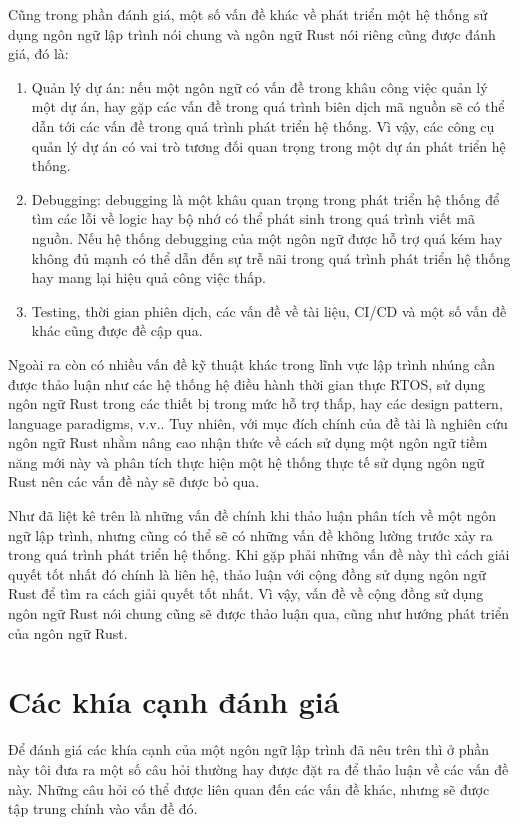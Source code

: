 Cũng trong phần đánh giá, một số vấn đề khác về phát triển một hệ thống sử dụng ngôn ngữ lập trình nói chung và ngôn ngữ Rust nói riêng cũng được đánh giá, đó là:

\begin{enumerate}
    \item Quản lý dự án: nếu một ngôn ngữ có vấn đề trong khâu công việc quản lý một dự án, hay gặp các vấn đề trong quá trình biên dịch mã nguồn sẽ có thể dẫn tới các vấn đề trong quá trình phát triển hệ thống. Vì vậy, các công cụ quản lý dự án có vai trò tương đối quan trọng trong một dự án phát triển hệ thống.

    \item Debugging: debugging là một khâu quan trọng trong phát triển hệ thống để tìm các lỗi về logic hay bộ nhớ có thể phát sinh trong quá trình viết mã nguồn.
Nếu hệ thống debugging của một ngôn ngữ được hỗ trợ quá kém hay không đủ mạnh có thể dẫn đến sự trễ nãi trong quá trình phát triển hệ thống hay mang lại hiệu quả công việc thấp.

    \item Testing, thời gian phiên dịch, các vấn đề về tài liệu, CI/CD và một số vấn đề khác cũng được đề cập qua.
\end{enumerate}

Ngoài ra còn có nhiều vấn đề kỹ thuật khác trong lĩnh vực lập trình nhúng cần được thảo luận như các hệ thống hệ điều hành thời gian thực RTOS, sử dụng ngôn ngữ Rust trong các thiết bị trong mức hỗ trợ thấp, hay các design pattern, language paradigms, v.v..
Tuy nhiên, với mục đích chính của đề tài là nghiên cứu ngôn ngữ Rust nhằm nâng cao nhận thức về cách sử dụng một ngôn ngữ tiềm năng mới này và phân tích thực hiện một hệ thống thực tế sử dụng ngôn ngữ Rust nên các vấn đề này sẽ được bỏ qua.

Như đã liệt kê trên là những vấn đề chính khi thảo luận phân tích về một ngôn ngữ lập trình, nhưng cũng có thể sẽ có những vấn đề không lường trước xảy ra trong quá trình phát triển hệ thống.
Khi gặp phải những vấn đề này thì cách giải quyết tốt nhất đó chính là liên hệ, thảo luận với cộng đồng sử dụng ngôn ngữ Rust để tìm ra cách giải quyết tốt nhất.
Vì vậy, vấn đề về cộng đồng sử dụng ngôn ngữ Rust nói chung cũng sẽ được thảo luận qua, cũng như hướng phát triển của ngôn ngữ Rust.

\section{Các khía cạnh đánh giá}
Để đánh giá các khía cạnh của một ngôn ngữ lập trình đã nêu trên thì ở phần này tôi đưa ra một số câu hỏi thường hay được đặt ra để thảo luận về các vấn đề này. Những câu hỏi có thể được liên quan đến các vấn đề khác, nhưng sẽ được tập trung chính vào vấn đề đó.
